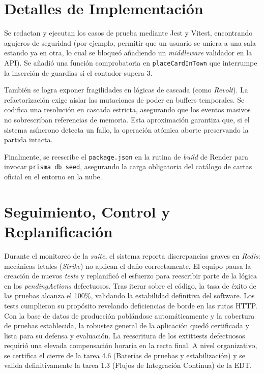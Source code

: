 \section{Detalles de Implementación}
Se redactan y ejecutan los casos de prueba mediante Jest y Vitest, encontrando agujeros de seguridad (por ejemplo, permitir que un usuario se uniera a una sala estando ya en otra, lo cual se bloqueó añadiendo un \textit{middleware} validador en la API). Se añadió una función comprobatoria en \texttt{placeCardInTown} que interrumpe la inserción de guardias si el contador supera 3. 

También se logra exponer fragilidades en lógicas de cascada (como \textit{Revolt}). La refactorización exige aislar las mutaciones de poder en buffers temporales. Se codifica una resolución en cascada estricta, asegurando que los eventos masivos no sobrescriban referencias de memoria. Esta aproximación garantiza que, si el sistema asíncrono detecta un fallo, la operación atómica aborte preservando la partida intacta.

Finalmente, se reescribe el \texttt{package.json} en la rutina de \textit{build} de Render para invocar \texttt{prisma db seed}, asegurando la carga obligatoria del catálogo de cartas oficial en el entorno en la nube.

\section{Seguimiento, Control y Replanificación}
Durante el monitoreo de la \textit{suite}, el sistema reporta discrepancias graves en \textit{Redis}: mecánicas letales (\textit{Strike}) no aplican el daño correctamente. El equipo pausa la creación de nuevos \textit{tests} y replanificó el esfuerzo para reescribir parte de la lógica en los \textit{pendingActions} defectuosos. Tras iterar sobre el código, la tasa de éxito de las pruebas alcanza el 100\%, validando la estabilidad definitiva del software. Los tests cumplieron su propósito revelando deficiencias de borde en las rutas HTTP. Con la base de datos de producción poblándose automáticamente y la cobertura de pruebas establecida, la robustez general de la aplicación quedó certificada y lista para su defensa y evaluación. La reescritura de los 	extit{tests} defectuosos requirió una elevada compensación horaria en la recta final. A nivel organizativo, se certifica el cierre de la tarea 4.6 (Baterías de pruebas y estabilización) y se valida definitivamente la tarea 1.3 (Flujos de Integración Continua) de la EDT.


